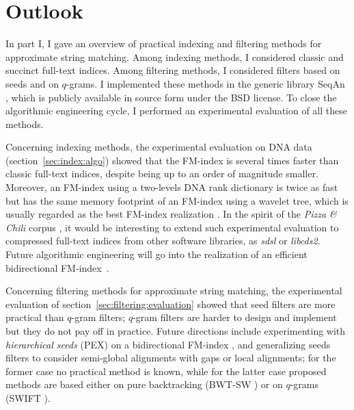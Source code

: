 \chapter{Outlook}

In part I, I gave an overview of practical indexing and filtering methods for approximate string matching.
Among indexing methods, I considered classic and succinct full-text indices.
Among filtering methods, I considered filters based on seeds and on $q$-grams.
I implemented these methods in the generic \CC library SeqAn \citep{Doering2008}, which is publicly available in source form under the BSD license.
To close the algorithmic engineering cycle, I performed an experimental evaluation of all these methods.

Concerning indexing methods, the experimental evaluation on DNA data (section~\ref{sec:index:algo}) showed that the FM-index is several times faster than classic full-text indices, despite being up to an order of magnitude smaller.
Moreover, an FM-index using a two-levels DNA rank dictionary is twice as fast but has the same memory footprint of an FM-index using a wavelet tree, which is usually regarded as the best FM-index realization \citep{Navarro2007}.
In the spirit of the \emph{Pizza \& Chili} corpus \citep{Ferragina2007a}, it would be interesting to extend such experimental evaluation to compressed full-text indices from other software libraries, as \emph{sdsl} \citep{Gog2014} or \emph{libcds2}.
Future algorithmic engineering will go into the realization of an efficient bidirectional FM-index~\citep{Lam2009, Schnattinger2010}.

Concerning filtering methods for approximate string matching, the experimental evaluation of section~\ref{sec:filtering:evaluation} showed that seed filters are more practical than $q$-gram filters; $q$-gram filters are harder to design and implement but they do not pay off in practice.
Future directions include experimenting with \emph{hierarchical seeds} (PEX) \citep{Navarro2001b} on a bidirectional FM-index \citep{Russo2009}, and generalizing seeds filters to consider semi-global alignments with gaps or local alignments; for the former case no practical method is known, while for the latter case proposed methods are based either on pure backtracking (BWT-SW \citep{Lam2008}) or on $q$-grams (SWIFT \citep{Rasmussen2006}).

